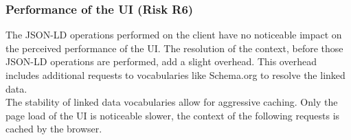 \subsubsection{Performance of the UI (Risk R6)}
The JSON-LD operations performed on the client have no noticeable impact on the perceived performance of the UI. The resolution of the context, before those JSON-LD operations are performed, add a slight overhead. This overhead includes additional requests to vocabularies like Schema.org to resolve the linked data. \\
The stability of linked data vocabularies allow for aggressive caching. Only the page load of the UI is noticeable slower, the context of the following requests is cached by the browser.
